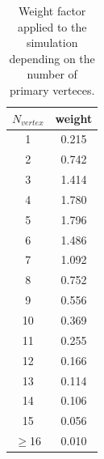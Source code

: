 \begin{table}[!ht]
\begin{center}
\begin{tabular}{|c|c|}
\hline
 $N_{vertex}$ &   weight   \\
\hline
\hline
 1        & 0.215 \\
 2        & 0.742 \\
 3        & 1.414 \\
 4        & 1.780 \\
 5        & 1.796 \\
 6        & 1.486 \\
 7        & 1.092 \\
 8        & 0.752 \\
 9        & 0.556 \\
10        & 0.369 \\
11        & 0.255 \\
12        & 0.166 \\
13        & 0.114 \\
14        & 0.106 \\
15        & 0.056 \\
$\geq$16  & 0.010 \\
\hline
\end{tabular}
\caption{Weight factor applied to the simulation depending on the number of
primary verteces.\label{tab:nvert_zll}}
\end{center}
\end{table}
